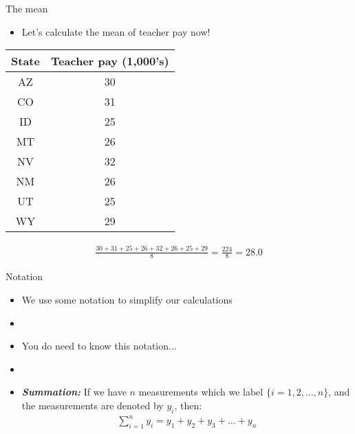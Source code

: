 \documentclass[xcolor=dvipsnames]{beamer}
\begin{document}
\begin{frame}{The mean}
	\begin{itemize}
		\item Let's calculate the mean of teacher pay now!
	\end{itemize}
	\begin{center}
		\begin{tabular}{|c|c|}
			\hline 
			\textbf{State} & \textbf{Teacher pay (1,000's)} \\ 
			\hline \hline
			AZ & 30 \\ \hline 
			CO &  31 \\ \hline 
			ID & 25  \\  \hline 
			MT &  26 \\ \hline 
			NV & 32 \\ \hline 
			NM &  26 \\ \hline 
			UT &  25 \\ \hline 
			WY &  29 \\ \hline 
		\end{tabular} 
	\end{center}
\begin{gather*}
	\frac{30+31+25+26+32+26+25+29}{8} = \frac{224}{8} = 28.0
\end{gather*}
\end{frame}

\begin{frame}{Notation}
	\begin{itemize}
		\item We use some notation to simplify our calculations \pause
		\item[]
		\item You do need to know this notation... \pause
		\item[]
		\item \textbf{\emph{Summation:}} If we have $n$ measurements which we label $\{i = 1, 2, \hdots, n\}$, and the measurements are denoted by $y_i$, then:
		\begin{gather*}
		\sum_{i=1}^{n} y_i = y_1 + y_2 + y_3 + \hdots + y_n
		\end{gather*}
	\end{itemize}
\end{frame}
\end{document}

